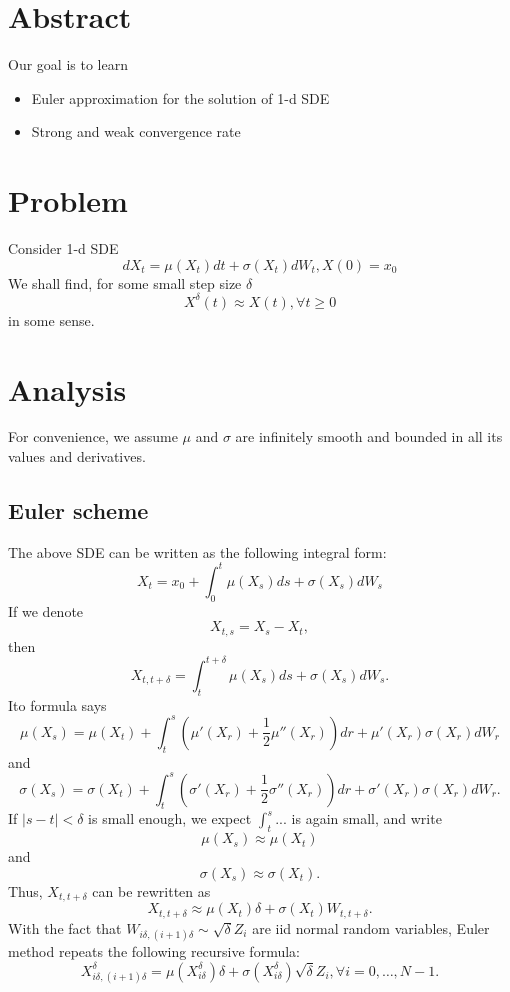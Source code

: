 \documentclass{article}
\begin{document}
\section{Abstract}
Our goal is to learn
\begin{itemize}
 \item Euler approximation for the solution of 1-d SDE
 \item Strong and weak convergence rate
\end{itemize}

\section{Problem}

Consider 1-d SDE 
$$d X_{t} = \mu(X_{t}) dt + \sigma(X_{t}) dW_{t}, X(0) = x_{0}$$
We shall find, for some small step size $\delta$
$$X^{\delta} (t) \approx X(t), \forall t\ge 0$$
in some sense.

\section{Analysis}
For convenience, we assume $\mu$ and $\sigma$ are infinitely smooth and bounded in all its values and derivatives.
\subsection{Euler scheme}
The above SDE can be written as the following integral form:
$$
X_{t} = x_{0}  + \int_{0}^{t}  \mu(X_{s}) ds + \sigma(X_{s}) dW_{s}
$$
If we denote 
$$X_{t,s} = X_{s} - X_{t},$$
then 
$$X_{t,t+\delta} = \int_{t}^{t+\delta}  \mu(X_{s}) ds + \sigma(X_{s}) dW_{s}.$$
Ito formula says
$$
\mu(X_{s}) =
\mu(X_{t}) + \int_{t}^{s} (\mu'(X_{r}) + \frac 1 2 \mu''(X_{r})) dr + \mu'(X_{r}) \sigma(X_{r}) dW_{r}
$$
and
$$
\sigma(X_{s}) =
\sigma(X_{t}) + 
\int_{t}^{s} (\sigma'(X_{r}) + \frac 1 2 \sigma''(X_{r})) dr + \sigma'(X_{r}) \sigma(X_{r}) dW_{r}.
$$
If $|s - t| < \delta$ is small enough, we expect $\int_t^s ...$ is again small, and write
$$\mu(X_{s}) \approx \mu(X_{t}) $$
and 
$$\sigma(X_{s}) \approx \sigma(X_{t}) .$$
Thus, $X_{t, t+\delta}$ can be rewritten as
$$
X_{t, t+\delta} \approx \mu(X_{t}) \delta + \sigma(X_{t}) W_{t,t+\delta}.
$$
With the fact that $W_{i \delta, (i+1)\delta} \sim \sqrt \delta Z_{i}$ are iid normal random variables, 
Euler method repeats the following recursive formula:
$$
X^\delta_{i\delta, (i+1)\delta} =  \mu(X^\delta_{i\delta}) \delta + \sigma(X^{\delta}_{i\delta})  \sqrt \delta Z_{i}, \forall i=0, \ldots, N-1.
$$
\end{document}
